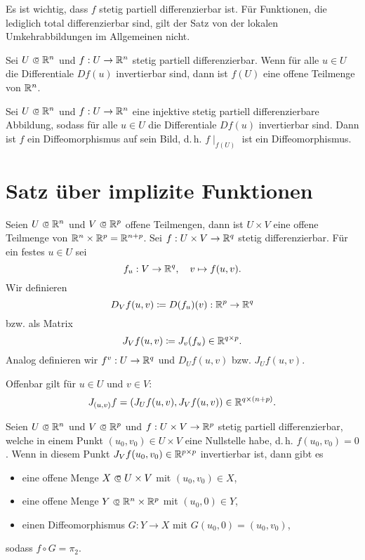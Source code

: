 \documentclass{cheat-sheet}
\begin{document}
\begin{bem}
Es ist wichtig, dass $f$ stetig partiell differenzierbar ist. Für Funktionen, die lediglich total differenzierbar sind, gilt der Satz von der lokalen Umkehrabbildungen im Allgemeinen nicht.
\end{bem}

\begin{kor}[Offenheitssatz]
Sei $U \opn \R^n$ und $f : U \to \mathbb{R}^n$ stetig partiell differenzierbar. Wenn für alle $u \in U$ die Differentiale $D f(u)$ invertierbar sind, dann ist $f(U)$ eine offene Teilmenge von $\mathbb{R}^n$.
\end{kor}

\begin{samepage}

\begin{kor}
Sei $U \opn \R^n$ und $f : U \to \mathbb{R}^n$ eine injektive stetig partiell differenzierbare Abbildung, sodass für alle $u \in U$ die Differentiale $D f(u)$ invertierbar sind. Dann ist $f$ ein Diffeomorphismus auf sein Bild, d.\,h. $f\mid_{f(U)}$ ist ein Diffeomorphismus.
\end{kor}


\section{Satz über implizite Funktionen}

\end{samepage}

\begin{nota}
Seien $U \opn \R^n$ und $V \opn \R^p$ offene Teilmengen, dann ist $U \times V$ eine offene Teilmenge von $\mathbb{R}^n \times \mathbb{R}^p = \mathbb{R}^{n + p}$. Sei $f : U \times V \to \mathbb{R}^q$ stetig differenzierbar. Für ein festes $u \in U$ sei
\[ f_u : V \to \mathbb{R}^q,\quad v \mapsto f(u, v). \]
Wir definieren
\[ D_V f(u, v) \coloneqq D(f_u)(v) : \mathbb{R}^p \to \mathbb{R}^q \]
bzw. als Matrix
\[ J_V f(u, v) \coloneqq J_v(f_u) \in \mathbb{R}^{q \times p}. \]
Analog definieren wir $f^v : U \to \mathbb{R}^q$ und $D_U f(u, v)$ bzw. $J_U f(u, v)$.
\end{nota}

\begin{bem}
Offenbar gilt für $u \in U$ und $v \in V$:
\[ J_{(u, v)} f = \left( J_U f(u, v), J_V f(u, v) \right) \in \mathbb{R}^{q \times (n + p)}. \]
\end{bem}

\begin{satz}
Seien $U \opn \R^n$ und $V \opn \R^p$ und $f : U \times V \to \mathbb{R}^p$ stetig partiell differenzierbar, welche in einem Punkt $(u_0, v_0) \in U \times V$ eine Nullstelle habe, d.\,h. $f(u_0, v_0) = 0$. Wenn in diesem Punkt $J_V f(u_0, v_0) \in \mathbb{R}^{p \times p}$ invertierbar ist, dann gibt es
\begin{itemize}
  \item eine offene Menge $X \opn U \times V$ mit $(u_0, v_0) \in X$,
  \item eine offene Menge $Y \opn \R^n \times \R^p$ mit $(u_0, 0) \in Y$,
  \item einen Diffeomorphismus $G : Y \to X$ mit $G(u_0, 0) = (u_0, v_0)$,
\end{itemize}
sodass $f \circ G = \pi_2.$
\end{satz}
\end{document}
